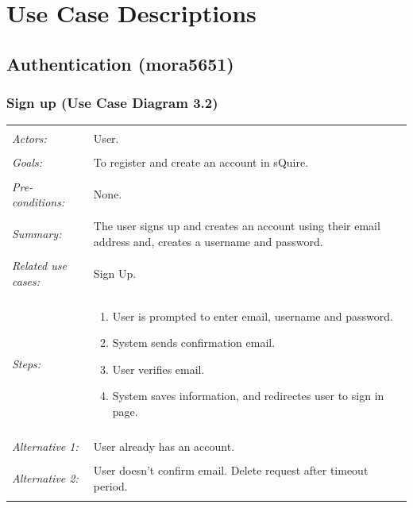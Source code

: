 \documentclass[11pt]{report}
\begin{document}

\chapter{Use Case Descriptions}

\section{Authentication (mora5651)}
\subsection{Sign up (Use Case Diagram 3.2)}
    \begin{tabular}{ p{2cm} p{12cm} }
        \hline
        \\
        \textit{Actors:} & User. \\ 
        \\
        \textit{Goals:} & To register and create an account in sQuire. \\
        \\
        \textit{Pre-conditions:} & None. \\
        \\
        \textit{Summary:} & The user signs up and creates an account using their email address and, creates a username and password. \\ 
        \\
        \textit{Related use cases:} & Sign Up. \\ 
        \\
        \textit{Steps:} & \begin{enumerate}
            \item User is prompted to enter email, username and password. 
            \item System sends confirmation email. 
            \item User verifies email. 
            \item System saves information, and redirectes user to sign in page. 
        \end{enumerate} \\
        \\
        \textit{Alternative 1:} & User already has an account. \\ 
        \\
        \textit{Alternative 2:} & User doesn't confirm email. Delete request after timeout period. \\
        \\
        \hline
    \end{tabular}
\end{document}
